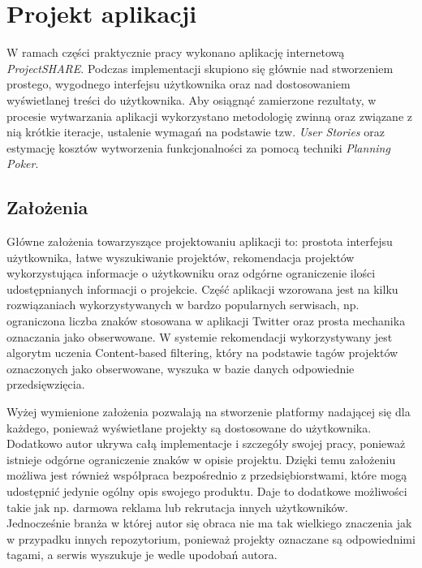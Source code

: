 \chapter{Projekt aplikacji}

W ramach części praktycznie pracy wykonano aplikację internetową \mbox{\textit{ProjectSHARE}}. Podczas implementacji skupiono się głównie nad stworzeniem prostego, wygodnego interfejsu użytkownika oraz nad dostosowaniem wyświetlanej treści do użytkownika. Aby osiągnąć zamierzone rezultaty, w procesie wytwarzania aplikacji wykorzystano metodologię zwinną oraz związane z nią krótkie iteracje, ustalenie wymagań na podstawie tzw. \textit{User Stories} oraz estymację kosztów wytworzenia funkcjonalności za pomocą techniki \textit{Planning Poker}.

\section{Założenia}

Główne założenia towarzyszące projektowaniu aplikacji to: prostota interfejsu
użytkownika, łatwe wyszukiwanie projektów, rekomendacja projektów wykorzystująca informacje o użytkowniku oraz odgórne
ograniczenie ilości udostępnianych informacji o projekcie. Część aplikacji wzorowana jest na kilku
rozwiązaniach wykorzystywanych w bardzo popularnych serwisach, np. ograniczona liczba
znaków stosowana w aplikacji Twitter oraz prosta mechanika oznaczania jako obserwowane. W systemie
rekomendacji wykorzystywany jest algorytm uczenia Content-based filtering, który na podstawie tagów projektów oznaczonych jako obserwowane, wyszuka w bazie danych odpowiednie przedsięwzięcia.

Wyżej wymienione założenia pozwalają na stworzenie platformy nadającej się dla
każdego, ponieważ wyświetlane projekty są dostosowane do użytkownika. Dodatkowo autor ukrywa całą implementacje i szczegóły
swojej pracy, ponieważ istnieje odgórne ograniczenie znaków w opisie projektu. Dzięki temu
założeniu możliwa jest również współpraca bezpośrednio z przedsiębiorstwami, które mogą udostępnić
jedynie ogólny opis swojego produktu. Daje to dodatkowe możliwości takie jak np.
darmowa reklama lub rekrutacja innych użytkowników. Jednocześnie
branża w której autor się obraca nie ma tak wielkiego znaczenia jak w przypadku innych
repozytorium, ponieważ projekty oznaczane są odpowiednimi tagami, a serwis wyszukuje
je wedle upodobań autora.

\bigskip
\bigskip
\bigskip
\bigskip


